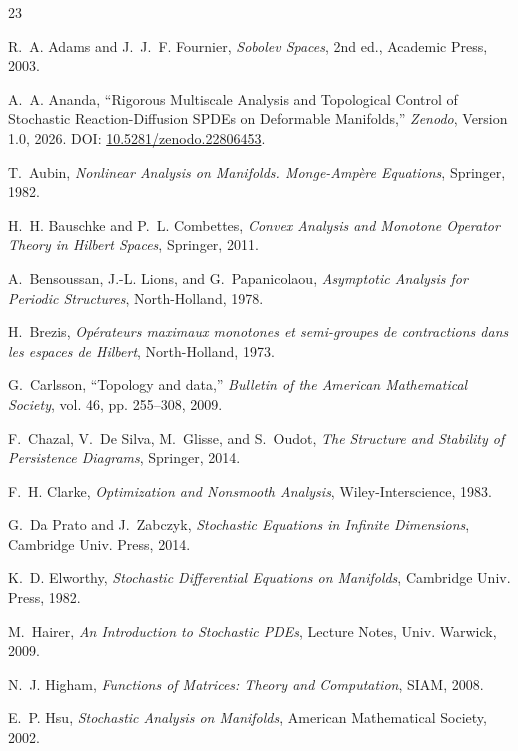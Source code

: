 \documentclass[11pt,a4paper]{article}
\theoremstyle{plain}
\theoremstyle{definition}
\theoremstyle{remark}
\begin{document}
\begin{thebibliography}{23}

R.~A. Adams and J.~J.~F. Fournier, \emph{Sobolev Spaces}, 2nd ed., Academic Press, 2003.

A.~A. Ananda, ``Rigorous Multiscale Analysis and Topological Control of Stochastic Reaction-Diffusion SPDEs on Deformable Manifolds,'' \emph{Zenodo}, Version 1.0, 2026. DOI: \href{https://doi.org/10.5281/zenodo.22806453}{10.5281/zenodo.22806453}.

T.~Aubin, \emph{Nonlinear Analysis on Manifolds. Monge-Amp\`{e}re Equations}, Springer, 1982.

H.~H. Bauschke and P.~L. Combettes, \emph{Convex Analysis and Monotone Operator Theory in Hilbert Spaces}, Springer, 2011.

A.~Bensoussan, J.-L. Lions, and G.~Papanicolaou, \emph{Asymptotic Analysis for Periodic Structures}, North-Holland, 1978.

H.~Brezis, \emph{Op\'{e}rateurs maximaux monotones et semi-groupes de contractions dans les espaces de Hilbert}, North-Holland, 1973.

G.~Carlsson, ``Topology and data,'' \emph{Bulletin of the American Mathematical Society}, vol. 46, pp. 255--308, 2009.

F.~Chazal, V.~De Silva, M.~Glisse, and S.~Oudot, \emph{The Structure and Stability of Persistence Diagrams}, Springer, 2014.

F.~H. Clarke, \emph{Optimization and Nonsmooth Analysis}, Wiley-Interscience, 1983.

G.~Da Prato and J.~Zabczyk, \emph{Stochastic Equations in Infinite Dimensions}, Cambridge Univ. Press, 2014.

K.~D. Elworthy, \emph{Stochastic Differential Equations on Manifolds}, Cambridge Univ. Press, 1982.

M.~Hairer, \emph{An Introduction to Stochastic PDEs}, Lecture Notes, Univ. Warwick, 2009.

N.~J. Higham, \emph{Functions of Matrices: Theory and Computation}, SIAM, 2008.

E.~P. Hsu, \emph{Stochastic Analysis on Manifolds}, American Mathematical Society, 2002.


\end{thebibliography}
\end{document}
